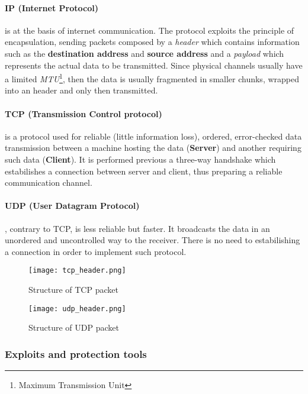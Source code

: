 \documentclass[../../main.tex]{subfiles}
\begin{document}
    \paragraph{IP (Internet Protocol)} is at the basis of internet
    communication. The protocol exploits the principle of encapsulation, sending
    packets composed by a \emph{header} which contains information such as the
    \textbf{destination address} and \textbf{source address} and a
    \emph{payload} which represents the actual data to be transmitted.
    Since physical channels usually have a limited \emph{MTU}\footnote{Maximum
    Transmission Unit}, then the data is usually fragmented in smaller chunks,
    wrapped into an header and only then transmitted.
    
    \paragraph{TCP (Transmission Control protocol)} is a protocol used for
    reliable (little information loss), ordered, error-checked data transmission
    between a machine hosting the data (\textbf{Server}) and another requiring
    such data (\textbf{Client}). It is performed previous a three-way handshake
    which estabilishes a connection between server and client, thus preparing a
    reliable communication channel.

    \paragraph{UDP (User Datagram Protocol)}, contrary to TCP, is less reliable
    but faster.
    It broadcasts the data in an unordered and uncontrolled way to the receiver. 
    There is no need to estabilishing a connection in order to implement such
    protocol.

    \begin{figure}[h]
        \centering
        \caption{Structure of TCP packet}
        \texttt{[image: tcp\_header.png]}
    \end{figure}

    \begin{figure}[h]
        \centering
        \caption{Structure of UDP packet}
        \texttt{[image: udp\_header.png]}
    \end{figure}

    \subsubsection{Exploits and protection tools}
\end{document}
